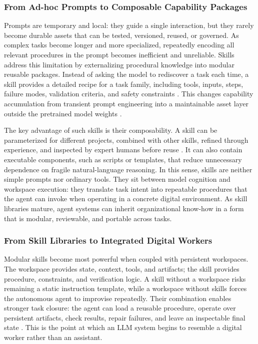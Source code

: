 \subsubsection{From Ad-hoc Prompts to Composable Capability Packages}

Prompts are temporary and local: they guide a single interaction, but they rarely become durable assets that can be tested, versioned, reused, or governed. As complex tasks become longer and more specialized, repeatedly encoding all relevant procedures in the prompt becomes inefficient and unreliable. Skills address this limitation by externalizing procedural knowledge into modular reusable packages. Instead of asking the model to rediscover a task each time, a skill provides a detailed recipe for a task family, including tools, inputs, steps, failure modes, validation criteria, and safety constraints \cite{anthropic2026skillsdocs,openclaw2026skillsdocs}. This changes capability accumulation from transient prompt engineering into a maintainable asset layer outside the pretrained model weights \cite{wang2023voyager,ling2026agentskills}.

The key advantage of such skills is their composability. A skill can be parameterized for different projects, combined with other skills, refined through experience, and inspected by expert humans before reuse \cite{anthropic2026skillsdocs,openclaw2026skillsrepo,ling2026agentskills}. It can also contain executable components, such as scripts or templates, that reduce unnecessary dependence on fragile natural-language reasoning. In this sense, skills are neither simple prompts nor ordinary tools. They sit between model cognition and workspace execution: they translate task intent into repeatable procedures that the agent can invoke when operating in a concrete digital environment. As skill libraries mature, agent systems can inherit organizational know-how in a form that is modular, reviewable, and portable across tasks.

\subsubsection{From Skill Libraries to Integrated Digital Workers}

Modular skills become most powerful when coupled with persistent workspaces. The workspace provides state, context, tools, and artifacts; the skill provides procedure, constraints, and verification logic. A skill without a workspace risks remaining a static instruction template, while a workspace without skills forces the autonomous agent to improvise repeatedly. Their combination enables stronger task closure: the agent can load a reusable procedure, operate over persistent artifacts, check results, repair failures, and leave an inspectable final state \cite{openclaw2026repo,wang2024openhands,jimenez2023swebench}. This is the point at which an LLM system begins to resemble a digital worker rather than an assistant.

